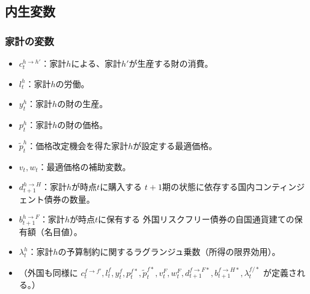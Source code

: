 \subsection*{内生変数}
\label{sec:model_variables_endogenous}
\subsubsection*{家計の変数}
\label{sec:model_variables_endogenous_households}
\begin{itemize}
    \item
        \label{itm:model_variables_endogenous_households_c_h_h}
        \(c_t^{h\to h'}\)：家計\(h\)による、家計\(h'\)が生産する財の消費。
    \item
        \label{itm:model_variables_endogenous_households_l_h}
        \(l_t^h\)：家計\(h\)の労働。
    \item
        \label{itm:model_variables_endogenous_households_y_h}
        \(y_t^h\)：家計\(h\)の財の生産。
    \item
        \label{itm:model_variables_endogenous_households_p_h}
        \(p_t^h\)：家計\(h\)の財の価格。
    \item
        \label{itm:model_variables_endogenous_households_p_h_tilde}
        \(\widetilde{p}_t^h\)：価格改定機会を得た家計\(h\)が設定する最適価格。
    \item
        \label{itm:model_variables_endogenous_households_v_w}
        \(v_t,w_t\)：最適価格の補助変数。
    \item
        \label{itm:model_variables_endogenous_households_d_h_H}
        \(d_{t+1}^{h\to H}\)：家計\(h\)が時点\(t\)に購入する
        \(t+1\)期の状態に依存する国内コンティンジェント債券の数量。
    \item
        \label{itm:model_variables_endogenous_households_b_h_F}
        \(b_{t+1}^{h\to F}\)：家計\(h\)が時点\(t\)に保有する
        外国リスクフリー債券の自国通貨建ての保有額（名目値）。
    \item
        \label{itm:model_variables_endogenous_households_lambda_h}
        \(\lambda_t^h\)：家計\(h\)の予算制約に関するラグランジュ乗数（所得の限界効用）。
    \item
        \label{itm:model_variables_endogenous_households_foreign}
        （外国も同様に
        \(c_t^{f\to f'},l_t^f,y_t^f,p_t^{f*},\widetilde{p}_t^{f*},v_t^F,w_t^F,d_{t+1}^{f\to F*},
        b_{t+1}^{f\to H*},\lambda_t^{f/*}\)
        が定義される。）
\end{itemize}
